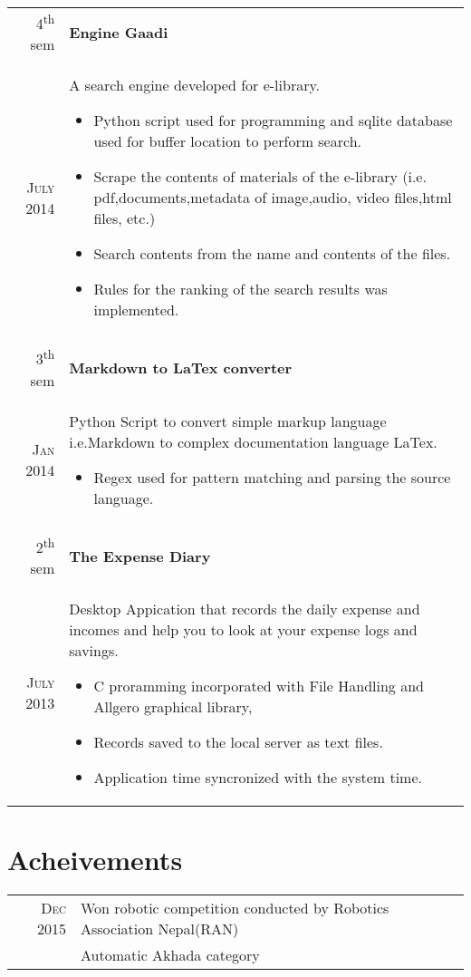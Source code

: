 \documentclass[a4paper,10pt]{article}
\begin{document}
\begin{tabular}{r|p{11cm}}
4\textsuperscript{th} sem & \textbf{Engine Gaadi}\\ \textsc{July 2014} & \small{A search engine developed for e-library.
\footnotesize{
\begin{itemize}
\item Python script used for programming and sqlite database used for buffer location to perform search.
\item Scrape the contents of materials of the e-library (i.e. pdf,documents,metadata of image,audio, video files,html files, etc.)
\item Search contents from the name and contents of the files. 
\item Rules for the ranking of the search results was implemented. 
\end{itemize}
}}\\\multicolumn{2}{c}{} \\

3\textsuperscript{th} sem & \textbf{Markdown to LaTex converter}\\ \textsc{Jan 2014} & \small{Python Script to convert simple markup language i.e.Markdown to complex documentation language LaTex.
\footnotesize{
\begin{itemize}
\item Regex used for pattern matching and parsing the source language.
\end{itemize}
}}\\\multicolumn{2}{c}{} \\

2\textsuperscript{th} sem & \textbf{The Expense Diary}\\ \textsc{July 2013} & \small{Desktop Appication that records the daily expense and incomes and help you to look at your expense logs and savings.
\footnotesize{
\begin{itemize}
\item C proramming incorporated with File Handling and Allgero graphical library,
\item Records saved to the local server as text files.
\item Application time syncronized with the system time.
\end{itemize}
}}\\

\end{tabular}

\section{Acheivements}
\begin{tabular}{rl}	
 \textsc{Dec 2015}  & Won robotic competition conducted by Robotics Association Nepal(RAN) \\
 & Automatic Akhada category\\
\end{tabular}
\end{document}
